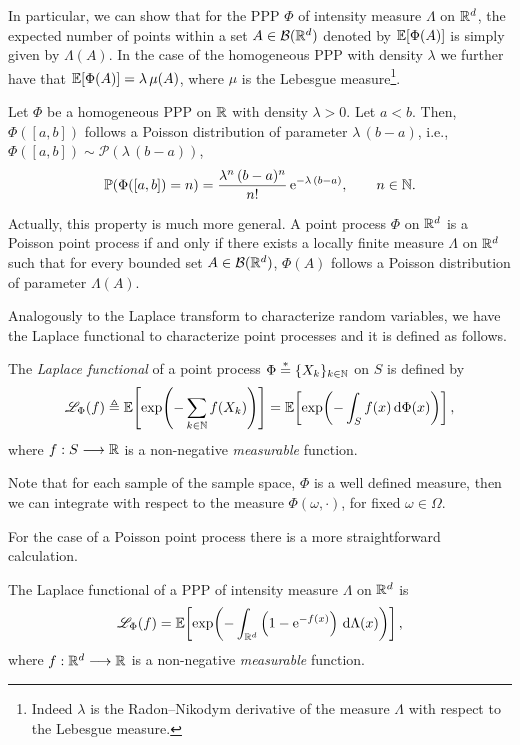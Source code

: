 In particular, we can show that for the PPP $\Phi$ of intensity measure $\Lambda$ on ${\mathbb R}^d$, the expected number of points within a set $A\in\mathcal{B}({\mathbb R}^d)$ denoted by ${\mathbb E}[\Phi(A)]$ is simply given by $\Lambda(A)$.
%
In the case of the homogeneous PPP with density $\lambda$ we further have that ${\mathbb E}[\Phi(A)] = \lambda\,\mu(A)$, where $\mu$ is the Lebesgue measure\footnote{Indeed $\lambda$ is the Radon–Nikodym derivative of the measure $\Lambda$ with respect to the Lebesgue measure.}.

\begin{example}
    Let $\Phi$ be a homogeneous PPP on ${\mathbb R}$ with density $\lambda > 0$.
    Let $a < b$.
    Then, $\Phi([a,b])$ follows a Poisson distribution of parameter $\lambda\,(b-a)$, i.e., $\Phi([a,b]) \sim \mathscr{P}(\lambda\,(b-a))$,
    \begin{align*}
        {\mathbb P}(\Phi([a,b]) = n) = \frac{\lambda^n\,(b-a)^n}{n!}\,\mathrm{e}^{-\lambda\,(b-a)}, \qquad n\in{\mathbb N}.
    \end{align*}
    
    Actually, this property is much more general.
    A point process $\Phi$ on ${\mathbb R}^d$ is a Poisson point process if and only if there exists a locally finite measure $\Lambda$ on ${\mathbb R}^d$ such that for every bounded set $A\in\mathcal B({\mathbb R}^d)$, $\Phi(A)$ follows a Poisson distribution of parameter $\Lambda(A)$.
\end{example}

Analogously to the Laplace transform to characterize random variables, we have the Laplace functional to characterize point processes and it is defined as follows.
\begin{definition}
    The \textit{Laplace functional} of a point process $\Phi \stackrel{*}{=}\{X_k\}_{k\in{\mathbb N}}$ on $S$ is defined by
    \begin{align*}
        \mathscr{L}_\Phi(f) \triangleq {\mathbb E}\!\left[\exp\!\left( -\sum_{k\in{\mathbb N}} f(X_k) \right)\right] = {\mathbb E}\!\left[ \exp\!\left(-\int_S f(x)\,\mathrm{d}\Phi(x)\right) \right],
    \end{align*}
    where $f:S\longrightarrow{\mathbb R}$ is a non-negative \textit{measurable} function.
\end{definition}

Note that for each sample of the sample space, $\Phi$ is a well defined measure, then we can integrate with respect to the measure $\Phi(\omega, \cdot)$, for fixed $\omega\in\Omega$.

For the case of a Poisson point process there is a more straightforward calculation.
\begin{theorem} \label{th:campbell}
    The Laplace functional of a PPP of intensity measure $\Lambda$ on ${\mathbb R}^d$ is
    \begin{align*}
        \mathscr{L}_\Phi(f) = {\mathbb E}\!\left[ \exp\!\left(-\int_{{\mathbb R}^d} \left(1-\mathrm{e}^{-f(x)}\right)\,\mathrm{d}\Lambda(x)\right) \right],
    \end{align*}
    where $f:{\mathbb R}^d\longrightarrow{\mathbb R}$ is a non-negative \textit{measurable} function.
\end{theorem}

